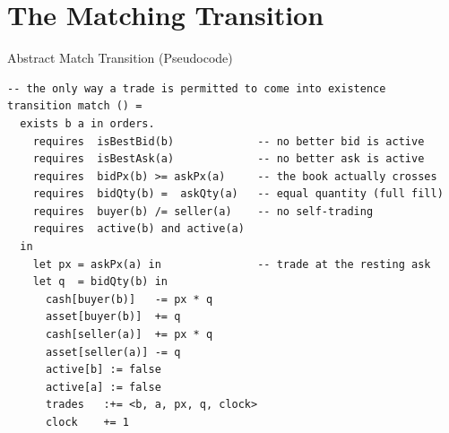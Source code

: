 \section{The Matching Transition}

\begin{frame}[fragile]{Abstract Match Transition (Pseudocode)}

\begin{lstlisting}[style=spec]
-- the only way a trade is permitted to come into existence
transition match () =
  exists b a in orders.
    requires  isBestBid(b)             -- no better bid is active
    requires  isBestAsk(a)             -- no better ask is active
    requires  bidPx(b) >= askPx(a)     -- the book actually crosses
    requires  bidQty(b) =  askQty(a)   -- equal quantity (full fill)
    requires  buyer(b) /= seller(a)    -- no self-trading
    requires  active(b) and active(a)
  in
    let px = askPx(a) in               -- trade at the resting ask
    let q  = bidQty(b) in
      cash[buyer(b)]   -= px * q
      asset[buyer(b)]  += q
      cash[seller(a)]  += px * q
      asset[seller(a)] -= q
      active[b] := false
      active[a] := false
      trades   :+= <b, a, px, q, clock>
      clock    += 1
\end{lstlisting}

\end{frame}

